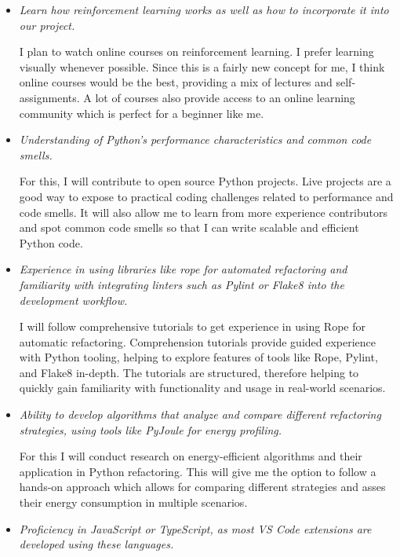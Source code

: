 \documentclass[12pt]{article}
\begin{document}
\begin{itemize}[label={}, wide=0pt, leftmargin=*]

  \item \textit{Learn how reinforcement learning works as well as how
    to incorporate it into our project.}

    I plan to watch online courses on reinforcement learning. I
    prefer learning visually whenever possible. Since this is a
    fairly new concept for me, I think online courses would be the
    best, providing a mix of lectures and self-assignments. A lot of
    courses also provide access to an online learning community which
    is perfect for a beginner like me.

  \item \textit{Understanding of Python's performance characteristics
    and common code smells.}

    For this, I will contribute to open source Python projects. Live
    projects are a good way to expose to practical coding challenges
    related to performance and code smells. It will also allow me to
    learn from more experience contributors and spot common code
    smells so that I can write scalable and efficient Python code.

  \item \textit{Experience in using libraries like rope for automated
      refactoring and familiarity with integrating linters such as
    Pylint or Flake8 into the development workflow.}

    I will follow comprehensive tutorials to get experience in using
    Rope for automatic refactoring. Comprehension tutorials provide
    guided experience with Python tooling, helping to explore
    features of tools like Rope, Pylint, and Flake8 in-depth.  The
    tutorials are structured, therefore helping to quickly gain
    familiarity with functionality and usage in real-world scenarios.

  \item \textit{Ability to develop algorithms that analyze and
      compare different refactoring strategies, using tools like
    PyJoule for energy profiling.}

    For this I will conduct research on energy-efficient algorithms
    and their application in Python refactoring. This will give me
    the option to follow a hands-on approach which allows for
    comparing different strategies and asses their energy consumption
    in multiple scenarios.

  \item \textit{Proficiency in JavaScript or TypeScript, as most VS
    Code extensions are developed using these languages.}


\end{itemize}
\end{document}
